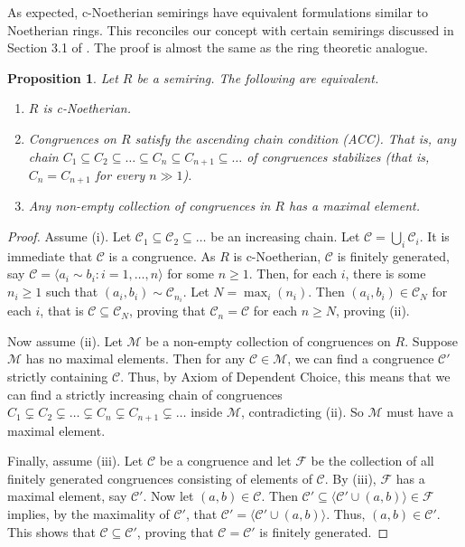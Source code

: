 \documentclass[notitlepage, 10pt]{article}
\theoremstyle{defin}
\theoremstyle{theo}
\newtheorem{prop}[defn]{Proposition}
\theoremstyle{rema}
\newcommand{\cC}{\mathcal{C}}
\newcommand{\cM}{\mathcal{M}}
\begin{document}
As expected, c-Noetherian semirings have equivalent formulations similar to Noetherian rings. This reconciles our concept with certain semirings discussed in Section 3.1 of \cite{JooMincheva2017}. The proof is almost the same as the ring theoretic analogue.

\begin{prop}
    \label{p:eqcnoeth}
    Let $R$ be a semiring. The following are equivalent.
    \begin{enumerate}
        \item $R$ is c-Noetherian.
        \item Congruences on $R$ satisfy the ascending chain condition (ACC). That is, any chain $C_1\subseteq C_2\subseteq \ldots \subseteq C_n \subseteq C_{n+1} \subseteq \ldots$ of congruences stabilizes (that is, $C_n =C_{n+1}$ for every $n\gg 1$).
        \item Any non-empty collection of congruences in $R$ has a maximal element. 
    \end{enumerate}
\end{prop}

\begin{proof}
    Assume (i). Let $\cC_1\subseteq \cC_2 \subseteq \ldots $ be an increasing chain. Let $\cC = \bigcup_i \cC_i$. It is immediate that $\cC$ is a congruence. As $R$ is c-Noetherian, $\cC$ is finitely generated, say $\cC = \langle a_i \sim b_i : i=1,\ldots, n\rangle$ for some $n\geq 1$. Then, for each $i$, there is some $n_i\geq 1$ such that $(a_i, b_i) \sim \cC_{n_i}$. Let $N=\max_i(n_i)$. Then $(a_i, b_i)\in \cC_N$ for each $i$, that is $\cC\subseteq \cC_N$, proving that $\cC_n = \cC$ for each $n\geq N$, proving (ii).

    Now assume (ii). Let $\cM$ be a non-empty collection of congruences on $R$. Suppose $\cM$ has no maximal elements. Then for any $\cC\in \cM$, we can find a congruence $\cC'$ strictly containing $\cC$. Thus, by Axiom of Dependent Choice, this means that we can find a strictly increasing chain of congruences $C_1\subsetneq C_2\subsetneq \ldots \subsetneq C_n \subsetneq C_{n+1} \subsetneq \ldots$ inside $\cM$, contradicting (ii). So $\cM$ must have a maximal element. 

    Finally, assume (iii). Let $\cC$ be a congruence and let $\mathcal{F}$ be the collection of all finitely generated congruences consisting of elements of $\cC$. By (iii), $\mathcal{F}$ has a maximal element, say $\cC'$. Now let $(a,b)\in \cC$. Then $\cC' \subseteq \langle \cC' \cup (a,b)\rangle \in \mathcal{F}$ implies, by the maximality of $\cC'$, that $\cC'=\langle\cC' \cup (a,b)\rangle$. Thus, $(a,b)\in \cC'$. This shows that $\cC \subseteq \cC'$, proving that $\cC = \cC'$ is finitely generated. 
\end{proof}
\end{document}
